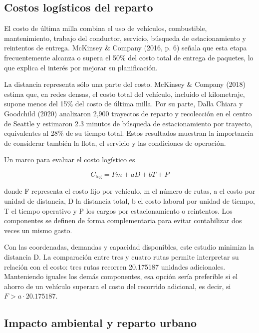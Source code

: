 \documentclass[11pt,a4paper]{article}
\numberwithin{equation}{section}
\begin{document}
\subsection{Costos logísticos del reparto}

El costo de última milla combina el uso de vehículos, combustible, mantenimiento, trabajo del conductor, servicio, búsqueda de estacionamiento y reintentos de entrega. McKinsey \& Company (2016, p. 6) señala que esta etapa frecuentemente alcanza o supera el 50\% del costo total de entrega de paquetes, lo que explica el interés por mejorar su planificación.


La distancia representa sólo una parte del costo. McKinsey \& Company (2018) estima que, en redes densas, el costo total del vehículo, incluido el kilometraje, supone menos del 15\% del costo de última milla. Por su parte, Dalla Chiara y Goodchild (2020) analizaron 2,900 trayectos de reparto y recolección en el centro de Seattle y estimaron 2.3 minutos de búsqueda de estacionamiento por trayecto, equivalentes al 28\% de su tiempo total. Estos resultados muestran la importancia de considerar también la flota, el servicio y las condiciones de operación.


Un marco para evaluar el costo logístico es


\begin{equation}\label{eq:costo}
C_{\mathrm{log}}=F m+aD+bT+P
\end{equation}


donde F representa el costo fijo por vehículo, m el número de rutas, a el costo por unidad de distancia, D la distancia total, b el costo laboral por unidad de tiempo, T el tiempo operativo y P los cargos por estacionamiento o reintentos. Los componentes se definen de forma complementaria para evitar contabilizar dos veces un mismo gasto.

Con las coordenadas, demandas y capacidad disponibles, este estudio minimiza la distancia D. La comparación entre tres y cuatro rutas permite interpretar su relación con el costo: tres rutas recorren 20.175187 unidades adicionales. Manteniendo iguales los demás componentes, esa opción sería preferible si el ahorro de un vehículo superara el costo del recorrido adicional, es decir, si \(F>a\cdot20.175187\).


\Needspace{110pt}

\subsection{Impacto ambiental y reparto urbano}
\end{document}
